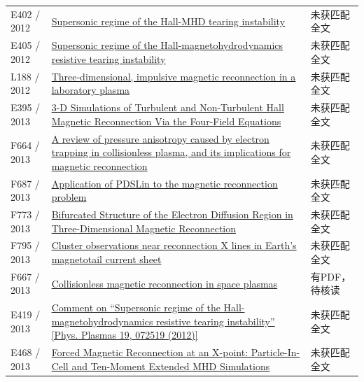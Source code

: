 \begin{longtable}{P{24mm}P{97mm}P{27mm}}
E402 / 2012 & \href{http://absimage.aps.org/image/APR12/MWS_APR12-2012-000859.pdf}{Supersonic regime of the Hall-MHD tearing instability} & 未获匹配全文\\

E405 / 2012 & \href{https://doi.org/10.1063/1.4739787}{Supersonic regime of the Hall-magnetohydrodynamics resistive tearing instability} & 未获匹配全文\\

L188 / 2012 & \href{https://doi.org/10.1029/2012gl054574}{Three‐dimensional,  impulsive magnetic reconnection in a laboratory plasma} & 未获匹配全文\\

E395 / 2013 & \href{https://ui.adsabs.harvard.edu/abs/2013shin.confE..78D/abstract}{3-D Simulations of Turbulent and Non-Turbulent Hall Magnetic Reconnection Via the Four-Field Equations} & 未获匹配全文\\

F664 / 2013 & \href{https://doi.org/10.1063/1.4811092}{A review of pressure anisotropy caused by electron trapping in collisionless plasma,  and its implications for magnetic reconnection} & 未获匹配全文\\

F687 / 2013 & \href{https://doi.org/10.1088/1749-4699/6/1/014002}{Application of PDSLin to the magnetic reconnection problem} & 未获匹配全文\\

F773 / 2013 & \href{https://doi.org/10.1103/physrevlett.110.265004}{Bifurcated Structure of the Electron Diffusion Region in Three-Dimensional Magnetic Reconnection} & 未获匹配全文\\

F795 / 2013 & \href{https://doi.org/10.1002/jgra.50403}{Cluster observations near reconnection X lines in Earth's magnetotail current sheet} & 未获匹配全文\\

F667 / 2013 & \href{https://doi.org/10.3389/fphy.2013.00031}{Collisionless magnetic reconnection in space plasmas} & 有PDF，待核读\\

E419 / 2013 & \href{https://doi.org/10.1063/1.4789449}{Comment on “Supersonic regime of the Hall-magnetohydrodynamics resistive tearing instability” [Phys. Plasmas 19,  072519 (2012)]} & 未获匹配全文\\

E468 / 2013 & \href{http://ui.adsabs.harvard.edu/abs/2013AGUFMSH13A2039W/abstract}{Forced Magnetic Reconnection at an X-point: Particle-In-Cell and Ten-Moment Extended MHD Simulations} & 未获匹配全文\\


\end{longtable}
